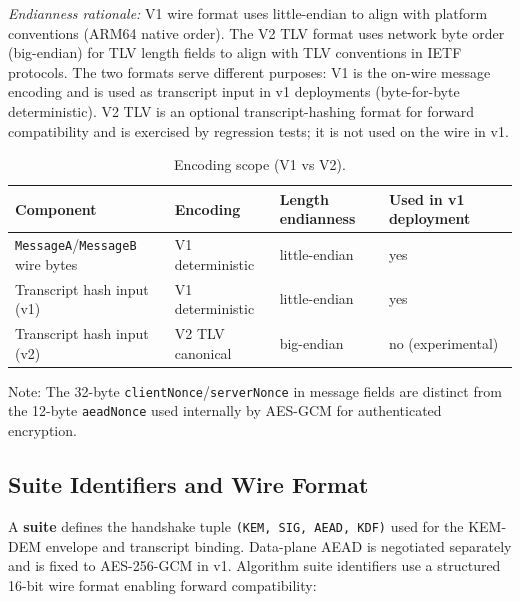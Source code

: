 \documentclass[10pt,journal,compsoc]{IEEEtran}
\begin{document}
\emph{Endianness rationale:} V1 wire format uses little-endian to align
with platform conventions (ARM64 native order). The V2 TLV format uses
network byte order (big-endian) for TLV length fields to align with TLV
conventions in IETF protocols. The two formats serve different purposes:
V1 is the on-wire message encoding and is used as transcript input in v1
deployments (byte-for-byte deterministic). V2 TLV is an optional
transcript-hashing format for forward compatibility and is exercised by
regression tests; it is not used on the wire in v1.

\begin{table}[!tp]
\centering
\caption{Encoding scope (V1 vs V2).}
\label{tab:supp-encoding-scope}
\begin{tabular}{@{}llll@{}}
\toprule
Component & Encoding & Length endianness & Used in v1 deployment \\
\midrule
\texttt{MessageA}/\texttt{MessageB} wire bytes & V1 deterministic & little-endian & yes \\
Transcript hash input (v1) & V1 deterministic & little-endian & yes \\
Transcript hash input (v2) & V2 TLV canonical & big-endian & no (experimental) \\
\bottomrule
\end{tabular}
\end{table}

Note: The 32-byte \texttt{clientNonce}/\texttt{serverNonce} in message
fields are distinct from the 12-byte \texttt{aeadNonce} used internally
by AES-GCM for authenticated encryption.

\subsection*{Suite Identifiers and Wire Format}

A \textbf{suite} defines the handshake tuple
\texttt{(KEM,\ SIG,\ AEAD,\ KDF)} used for the KEM-DEM envelope and
transcript binding. Data-plane AEAD is negotiated separately and is
fixed to AES-256-GCM in v1. Algorithm suite identifiers use a
structured 16-bit wire format enabling forward compatibility:
\end{document}
